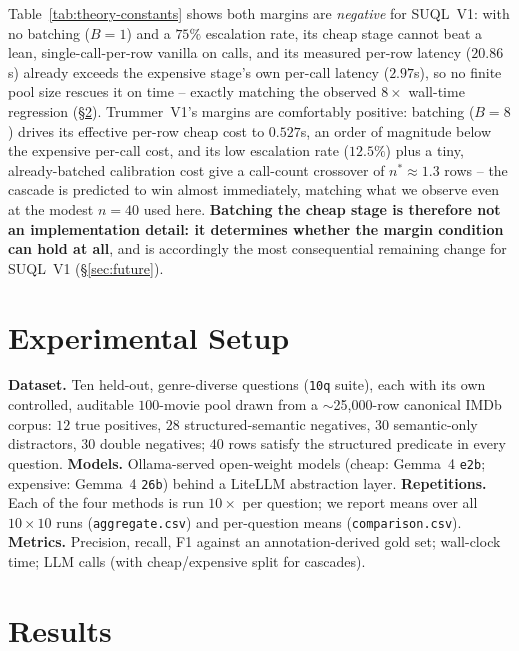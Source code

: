 \documentclass[sigconf,natbib=false]{acmart}
\begin{document}
Table~\ref{tab:theory-constants} shows both margins are \emph{negative} for SUQL~V1: with no batching ($B{=}1$) and a $75\%$ escalation rate, its cheap stage cannot beat a lean, single-call-per-row vanilla on calls, and its measured per-row latency ($20.86$s) already exceeds the expensive stage's own per-call latency ($2.97$s), so no finite pool size rescues it on time -- exactly matching the observed $8\times$ wall-time regression (\S\ref{sec:results}). Trummer~V1's margins are comfortably positive: batching ($B{=}8$) drives its effective per-row cheap cost to $0.527$s, an order of magnitude below the expensive per-call cost, and its low escalation rate ($12.5\%$) plus a tiny, already-batched calibration cost give a call-count crossover of $n^\ast\approx 1.3$ rows -- the cascade is predicted to win almost immediately, matching what we observe even at the modest $n{=}40$ used here. \textbf{Batching the cheap stage is therefore not an implementation detail: it determines whether the margin condition can hold at all}, and is accordingly the most consequential remaining change for SUQL~V1 (\S\ref{sec:future}).

\section{Experimental Setup}
\label{sec:eval}
\textbf{Dataset.} Ten held-out, genre-diverse questions (\texttt{10q} suite), each with its own controlled, auditable $100$-movie pool drawn from a $\sim$25{,}000-row canonical IMDb corpus: $12$ true positives, $28$ structured-semantic negatives, $30$ semantic-only distractors, $30$ double negatives; $40$ rows satisfy the structured predicate in every question.
\textbf{Models.} Ollama-served open-weight models (cheap: Gemma~4 \texttt{e2b}; expensive: Gemma~4 \texttt{26b}) behind a LiteLLM abstraction layer.
\textbf{Repetitions.} Each of the four methods is run $10\times$ per question; we report means over all $10{\times}10$ runs (\texttt{aggregate.csv}) and per-question means (\texttt{comparison.csv}).
\textbf{Metrics.} Precision, recall, F1 against an annotation-derived gold set; wall-clock time; LLM calls (with cheap/expensive split for cascades).

\section{Results}
\label{sec:results}

\begin{table}[t]
\caption{Cost per question, averaged over 10 questions $\times$ 10 reps.}
\label{tab:cost}
\centering\footnotesize
{}
\end{table}
\end{document}
